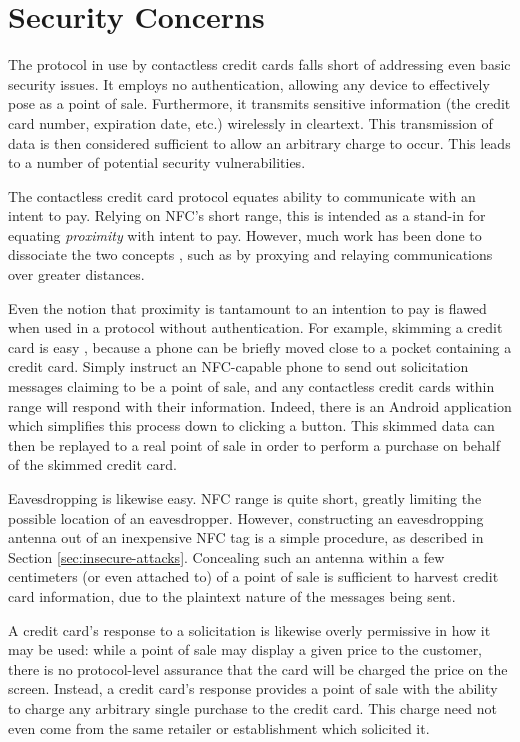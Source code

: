 \section{Security Concerns}
\label{sec:intro-security}

The protocol in use by contactless credit cards falls short of addressing even basic security issues.
It employs no authentication, allowing any device to effectively pose as a point of sale.
Furthermore, it transmits sensitive information (the credit card number, expiration date, etc.) wirelessly in cleartext.
This transmission of data is then considered sufficient to allow an arbitrary charge to occur.
This leads to a number of potential security vulnerabilities.

The contactless credit card protocol equates ability to communicate with an intent to pay.
Relying on NFC's short range, this is intended as a stand-in for equating \emph{proximity} with intent to pay.
However, much work has been done to dissociate the two concepts \cite{brown2013evaluating, Drimer:2007:KYE:1362903.1362910, francis2010practical, hancke2005practical, kfir2005picking, markantonakis2012practical}, such as by proxying and relaying communications over greater distances.

Even the notion that proximity is tantamount to an intention to pay is flawed when used in a protocol without authentication.
For example, skimming a credit card is easy \cite{lee2012nfc, lifchitz2012hacking, roland2013cloning}, because a phone can be briefly moved close to a pocket containing a credit card.
Simply instruct an NFC-capable phone to send out solicitation messages claiming to be a point of sale, and any contactless credit cards within range will respond with their information.
Indeed, there is an Android application \cite{NFCProxy} which simplifies this process down to clicking a button.
This skimmed data can then be replayed to a real point of sale in order to perform a purchase on behalf of the skimmed credit card.

Eavesdropping is likewise easy.
NFC range is quite short, greatly limiting the possible location of an eavesdropper.
However, constructing an eavesdropping antenna out of an inexpensive NFC tag is a simple procedure, as described in Section \ref{sec:insecure-attacks}.
Concealing such an antenna within a few centimeters (or even attached to) of a point of sale is sufficient to harvest credit card information,
    due to the plaintext nature of the messages being sent.

A credit card's response to a solicitation is likewise overly permissive in how it may be used:
    while a point of sale may display a given price to the customer, there is no protocol-level assurance that the card will be charged the price on the screen.
Instead, a credit card's response provides a point of sale with the ability to charge any arbitrary single purchase to the credit card.
This charge need not even come from the same retailer or establishment which solicited it.

